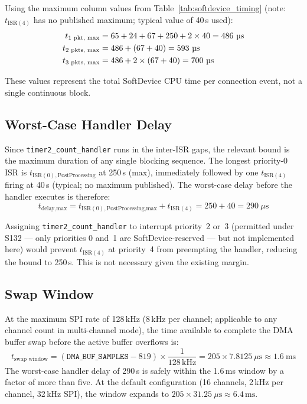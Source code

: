 Using the maximum column values from Table~\ref{tab:softdevice_timing} (note:
$t_{\text{ISR}(4)}$ has no published maximum; typical value of 40\,\textmu{}s used):
\begin{align}
t_{\text{1 pkt, max}} &= 65 + 24 + 67 + 250 + 2 \times 40 = 486~\text{\textmu{}s} \\
t_{\text{2 pkts, max}} &= 486 + (67 + 40) = 593~\text{\textmu{}s} \\
t_{\text{3 pkts, max}} &= 486 + 2 \times (67 + 40) = 700~\text{\textmu{}s}
\end{align}

These values represent the total SoftDevice CPU time per connection event, not a
single continuous block.

\subsection*{Worst-Case Handler Delay}

Since \texttt{timer2\_count\_handler} runs in the inter-ISR gaps, the relevant
bound is the maximum duration of any single blocking sequence. The longest
priority-0 ISR is $t_{\text{ISR}(0),\text{PostProcessing}}$ at 250\,\textmu{}s
(max), immediately followed by one $t_{\text{ISR}(4)}$ firing at 40\,\textmu{}s
(typical; no maximum published). The worst-case delay before the handler executes
is therefore:
\begin{equation}
t_{\text{delay,max}} = t_{\text{ISR}(0),\text{PostProcessing,max}} + t_{\text{ISR}(4)}
= 250 + 40 = 290~\mu\text{s}
\end{equation}

Assigning \texttt{timer2\_count\_handler} to interrupt priority~2 or~3 (permitted
under S132 --- only priorities 0 and~1 are SoftDevice-reserved --- but not
implemented here) would prevent $t_{\text{ISR}(4)}$ at priority~4 from preempting
the handler, reducing the bound to 250\,\textmu{}s. This is not necessary given
the existing margin.

\subsection*{Swap Window}

At the maximum SPI rate of 128\,kHz (8\,kHz per channel; applicable to any channel
count in multi-channel mode), the time available to complete the DMA buffer swap
before the active buffer overflows is:
\begin{equation}
t_{\text{swap window}} =
(\texttt{DMA\_BUF\_SAMPLES} - 819) \times \frac{1}{128\,\text{kHz}}
= 205 \times 7.8125~\mu\text{s} \approx 1.6~\text{ms}
\end{equation}
The worst-case handler delay of 290\,\textmu{}s is safely within the 1.6\,ms
window by a factor of more than five.
At the default configuration (16 channels, 2\,kHz per channel, 32\,kHz SPI), the
window expands to $205 \times 31.25~\mu\text{s} \approx 6.4\,\text{ms}$.



